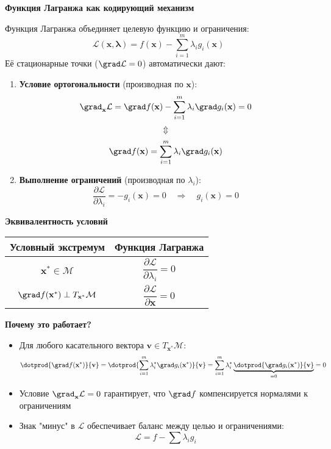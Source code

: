 \begin{center}
\large\textbf{Функция Лагранжа как кодирующий механизм}
\end{center}
Функция Лагранжа объединяет целевую функцию и ограничения:
\[
\mathcal{L}(\mathbf{x}, \boldsymbol{\lambda}) = f(\mathbf{x}) - \sum_{i=1}^m \lambda_i g_i(\mathbf{x})
\]
Её стационарные точки ($\grad \mathcal{L} = 0$) автоматически дают:

\begin{enumerate}[label=\Roman*.]
    \item \textbf{Условие ортогональности} (производная по $\mathbf{x}$):
    \[
    \grad_{\mathbf{x}} \mathcal{L} = \grad f(\mathbf{x}) - \sum_{i=1}^m \lambda_i \grad g_i(\mathbf{x}) = 0
    \]
    \[
    \Updownarrow
    \]
    \[
    \grad f(\mathbf{x}) = \sum_{i=1}^m \lambda_i \grad g_i(\mathbf{x})
    \]
    
    \item \textbf{Выполнение ограничений} (производная по $\lambda_i$):
    \[
    \frac{\partial \mathcal{L}}{\partial \lambda_i} = -g_i(\mathbf{x}) = 0 \quad \Rightarrow \quad g_i(\mathbf{x}) = 0
    \]
\end{enumerate}

\begin{center}
\large\textbf{Эквивалентность условий}
\end{center}
\begin{center}
\begin{tabular}{|c|c|}
\hline
\textbf{Условный экстремум} & \textbf{Функция Лагранжа} \\
\hline
$\mathbf{x}^* \in \mathcal{M}$ & $\dfrac{\partial \mathcal{L}}{\partial \lambda_i} = 0$ \\
\hline
$\grad f(\mathbf{x}^*) \perp T_{\mathbf{x}^*}\mathcal{M}$ & $\dfrac{\partial \mathcal{L}}{\partial \mathbf{x}} = 0$ \\
\hline
\end{tabular}
\end{center}

\begin{center}
\large\textbf{Почему это работает?}
\end{center}
\begin{itemize}
    \item Для любого касательного вектора $\mathbf{v} \in T_{\mathbf{x}^*}\mathcal{M}$:
    \[
    \dotprod{\grad f(\mathbf{x}^*)}{\mathbf{v}} = \dotprod{\sum_{i=1}^m \lambda_i^* \grad g_i(\mathbf{x}^*)}{\mathbf{v}} = \sum_{i=1}^m \lambda_i^* \underbrace{\dotprod{\grad g_i(\mathbf{x}^*)}{\mathbf{v}}}_{=0} = 0
    \]
    
    \item Условие $\grad_{\mathbf{x}} \mathcal{L} = 0$ гарантирует, что $\grad f$ компенсируется нормалями к ограничениям
    
    \item Знак "минус" в $\mathcal{L}$ обеспечивает баланс между целью и ограничениями:
    \[
    \mathcal{L} = f - \sum \lambda_i g_i
    \]
\end{itemize}

